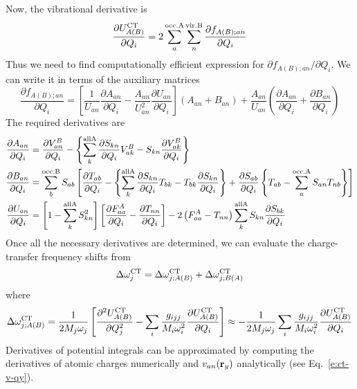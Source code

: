 \documentclass[a4paper,titlepage,twoside,fleqn,12pt]{book}
\newcommand{\fderiv}[2]{\ensuremath{
    \frac{\partial #1}{\partial #2}}}
\newcommand{\sderiv}[2]{\ensuremath{
    \frac{\partial^2 #1}{\partial #2^2}
    }}
\newcommand{\fderivm}[2]{\ensuremath{
    {\partial #1}/{\partial #2}}}
\begin{document}
\begin{refsection}
Now, the vibrational derivative is
%
\begin{equation}   \label{e:force-ct-ab}
  \fderiv{U^{\rm CT}_{A(B)}}{Q_i} = 2\sum_a^{\rm occ. A} \sum_n^{\rm vir. B} \fderiv{f_{A(B);an}}{Q_i}
\end{equation}
%
Thus we need to find computationally efficient expression for $\fderivm{f_{A(B);an}}{Q_i}$.
We can write it in terms of the auxiliary matrices
%
\begin{equation}  
  \fderiv{f_{A(B);an}}{Q_i} = 
  \left[
 \frac{1}{U_{an}} \fderiv{A_{an}}{Q_i} - \frac{A_{an}}{U_{an}^2} \fderiv{U_{an}}{Q_i}
  \right] \left( A_{an} + B_{an} \right) 
   +
  \frac{A_{an}}{U_{an}} \left( \fderiv{A_{an}}{Q_i} + \fderiv{B_{an}}{Q_i} \right)
\end{equation}
%
The required derivatives are
%
\begin{subequations}  
\begin{align}
    \fderiv{A_{an}}{Q_i}  &= \fderiv{V^B_{an}}{Q_i} 
       - \left\{
          \sum_k^{\rm all A} \fderiv{S_{kn}}{Q_i}  V_{ak}^B - S_{kn} \fderiv{V_{ak}^B}{Q_i}
         \right\}  \\
    \fderiv{B_{an}}{Q_i}  &= \sum_b^{\rm occ. B} S_{ab} \left[ 
         \fderiv{T_{ab}}{Q_i} - \left\{
          \sum_k^{\rm all A} \fderiv{S_{kn}}{Q_i}  T_{bk} - T_{bk} \fderiv{S_{kn}}{Q_i}
         \right\} + \fderiv{S_{ab}}{Q_i}  \left\{ T_{ab} - \sum_a^{\rm occ. A} S_{an}T_{nb} \right\}
       \right] \\
    \fderiv{U_{an}}{Q_i}  &= \left[ 1 - \sum_k^{\rm all A} S^2_{kn}\right]
                             \left[ \fderiv{F_{aa}^A}{Q_i} - \fderiv{T_{nn}}{Q_i}\right] 
                     -2  \left( F_{aa}^A - T_{nn} \right) \sum_k^{\rm all A} S_{kn} \fderiv{S_{bk}}{Q_i}
\end{align}
\end{subequations}
%
Once all the necessary derivatives are determined, 
we can evaluate the charge\hyp{}transfer frequency shifts
from
%
\begin{equation} \label{e:dw-ct}
\Delta \omega_j^{\rm CT} =
\Delta \omega_{j;A(B)}^{\rm CT} + \Delta \omega_{j;B(A)}^{\rm CT}
\end{equation}
%
where
%
\begin{equation} \label{e:dw-ct-ab}
\Delta \omega_{j;A(B)}^{\rm CT} =
\frac{1}{2M_j\omega_j} \left[ 
\sderiv{U^{\rm CT}_{A(B)}}{Q_j} -
\sum_i \frac{g_{ijj}}{M_i\omega_i^2}\fderiv{U^{\rm CT}_{A(B)}}{Q_i}
\right]
\approx 
-\frac{1}{2M_j\omega_j}\sum_i \frac{g_{ijj}}{M_i\omega_i^2}\fderiv{U^{\rm CT}_{A(B)}}{Q_i}
\end{equation}
%
Derivatives of potential integrals can be approximated by
computing the derivatives of atomic charges numerically
and $v_{an}({\bf r}_y)$ analytically (see Eq.~\eqref{e:ct-v-qy}).


\end{refsection}
\end{document}
